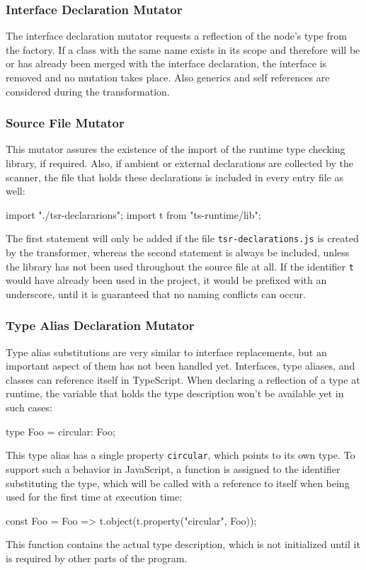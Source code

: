 \subsubsection{Interface Declaration Mutator}

The interface declaration mutator requests a reflection of the node's type from the factory. If a class with the same name exists in its scope and therefore will be or has already been merged with the interface declaration, the interface is removed and no mutation takes place. Also generics and self references are considered during the transformation.

\subsubsection{Source File Mutator}

This mutator assures the existence of the import of the runtime type checking library, if required. Also, if ambient or external declarations are collected by the scanner, the file that holds these declarations is included in every entry file as well:
\begin{JsCode}[numbers=none]
import "./tsr-declararions";
import t from "ts-runtime/lib";  
\end{JsCode}
The first statement will only be added if the file \texttt{tsr-declarations.js} is created by the transformer, whereas the second statement is always be included, unless the library has not been used throughout the source file at all. If the identifier \texttt{t} would have already been used in the project, it would be prefixed with an underscore, until it is guaranteed that no naming conflicts can occur.

\subsubsection{Type Alias Declaration Mutator}

Type alias substitutions are very similar to interface replacements, but an important aspect of them has not been handled yet. Interfaces, type aliases, and classes can reference itself in TypeScript. When declaring a reflection of a type at runtime, the variable that holds the type description won't be available yet in such cases:
\begin{JsCode}[numbers=none]
type Foo = { circular: Foo; }  
\end{JsCode}
This type alias has a single property \texttt{circular}, which points to its own type. To support such a behavior in JavaScript, a function is assigned to the identifier substituting the type, which will be called with a reference to itself when being used for the first time at execution time:
\begin{JsCode}[numbers=none]
const Foo = Foo => t.object(t.property("circular", Foo));
\end{JsCode}
This function contains the actual type description, which is not initialized until it is required by other parts of the program.

